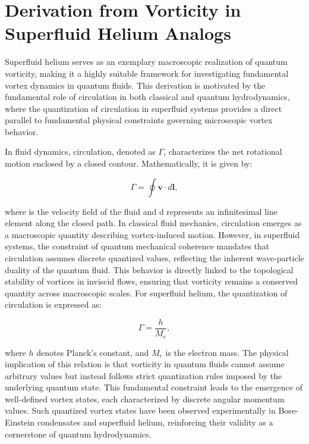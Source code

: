 \section*{Derivation from Vorticity in Superfluid Helium Analogs}

Superfluid helium serves as an exemplary macroscopic realization of quantum vorticity, making it a highly suitable framework for investigating fundamental vortex dynamics in quantum fluids. This derivation is motivated by the fundamental role of circulation in both classical and quantum hydrodynamics, where the quantization of circulation in superfluid systems provides a direct parallel to fundamental physical constraints governing microscopic vortex behavior.


In fluid dynamics, circulation, denoted as $\Gamma$, characterizes the net rotational motion enclosed by a closed contour. Mathematically, it is given by:

\begin{equation*}
\Gamma = \oint \mathbf{v} \cdot d\mathbf{l},
\label{eq:circulation_definition}
\end{equation*}

where  is the velocity field of the fluid and d represents an infinitesimal line element along the closed path. In classical fluid mechanics, circulation emerges as a macroscopic quantity describing vortex-induced motion. However, in superfluid systems, the constraint of quantum mechanical coherence mandates that circulation assumes discrete quantized values, reflecting the inherent wave-particle duality of the quantum fluid. This behavior is directly linked to the topological stability of vortices in inviscid flows, ensuring that vorticity remains a conserved quantity across macroscopic scales. For superfluid helium, the quantization of circulation is expressed as:

\begin{equation*}
\Gamma = \frac{h}{M_e},
\label{eq:circulation}
\end{equation*}

where $h$ denotes Planck’s constant, and  $ M_e $ is the electron mass. The physical implication of this relation is that vorticity in quantum fluids cannot assume arbitrary values but instead follows strict quantization rules imposed by the underlying quantum state. This fundamental constraint leads to the emergence of well-defined vortex states, each characterized by discrete angular momentum values. Such quantized vortex states have been observed experimentally in Bose-Einstein condensates and superfluid helium, reinforcing their validity as a cornerstone of quantum hydrodynamics.


